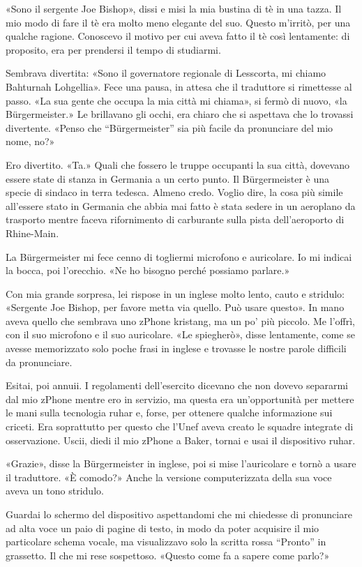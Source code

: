 «Sono il sergente Joe Bishop», dissi e misi la mia bustina di tè in una
tazza. Il mio modo di fare il tè era molto meno elegante del suo. Questo
m'irritò, per una qualche ragione. Conoscevo il motivo per cui aveva
fatto il tè così lentamente: di proposito, era per prendersi il tempo di
studiarmi.

Sembrava divertita: «Sono il governatore regionale di Lesscorta, mi
chiamo Bahturnah Lohgellia». Fece una pausa, in attesa che il traduttore
si rimettesse al passo. «La sua gente che occupa la mia città mi
chiama», si fermò di nuovo, «la Bürgermeister.» Le brillavano gli occhi,
era chiaro che si aspettava che lo trovassi divertente. «Penso che
``Bürgermeister'' sia più facile da pronunciare del mio nome, no?»

Ero divertito. «Ta.» Quali che fossero le truppe occupanti la sua città,
dovevano essere state di stanza in Germania a un certo punto. Il
Bürgermeister è una specie di sindaco in terra tedesca. Almeno credo.
Voglio dire, la cosa più simile all'essere stato in Germania che abbia
mai fatto è stata sedere in un aeroplano da trasporto mentre faceva
rifornimento di carburante sulla pista dell'aeroporto di Rhine-Main.

La Bürgermeister mi fece cenno di togliermi microfono e auricolare. Io
mi indicai la bocca, poi l'orecchio. «Ne ho bisogno perché possiamo
parlare.»

Con mia grande sorpresa, lei rispose in un inglese molto lento, cauto e
stridulo: «Sergente Joe Bishop, per favore metta via quello. Può usare
questo». In mano aveva quello che sembrava uno zPhone kristang, ma un
po' più piccolo. Me l'offrì, con il suo microfono e il suo auricolare.
«Le spiegherò», disse lentamente, come se avesse memorizzato solo poche
frasi in inglese e trovasse le nostre parole difficili da pronunciare.

Esitai, poi annuii. I regolamenti dell'esercito dicevano che non dovevo
separarmi dal mio zPhone mentre ero in servizio, ma questa era
un'opportunità per mettere le mani sulla tecnologia ruhar e, forse, per
ottenere qualche informazione sui criceti. Era soprattutto per questo
che l'Unef aveva creato le squadre integrate di osservazione. Uscii,
diedi il mio zPhone a Baker, tornai e usai il dispositivo ruhar.

«Grazie», disse la Bürgermeister in inglese, poi si mise l'auricolare e
tornò a usare il traduttore. «È comodo?» Anche la versione
computerizzata della sua voce aveva un tono stridulo.

Guardai lo schermo del dispositivo aspettandomi che mi chiedesse di
pronunciare ad alta voce un paio di pagine di testo, in modo da poter
acquisire il mio particolare schema vocale, ma visualizzavo solo la
scritta rossa ``Pronto'' in grassetto. Il che mi rese sospettoso.
«Questo come fa a sapere come parlo?»

